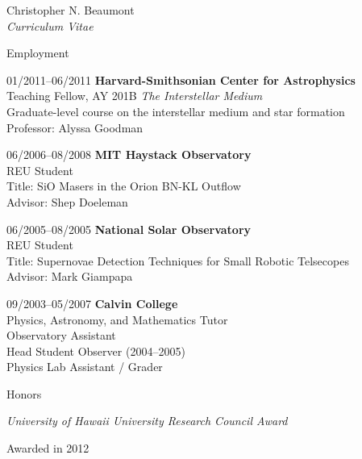\documentclass[10pt]{article}
\newenvironment{sublist}{%
	\begin{list}{}{%
		\setlength{\itemsep}{0em}\setlength{\parsep}{0em}%
		\setlength{\topsep}{0em}\setlength{\parskip}{0em}%
	}%
}%
{ \end{list} }
\begin{document}
\begin{cv}{Christopher N. Beaumont\\{\large \itshape Curriculum Vitae}}
\begin{cvlist}{Employment}
	\item[01/2011--06/2011] \textbf{Harvard-Smithsonian Center for Astrophysics} \\
	Teaching Fellow, AY 201B \textit{The Interstellar Medium} \\
	Graduate-level course on the interstellar medium and star formation \\
	Professor: Alyssa Goodman \\
	
	\item[06/2006--08/2008] \textbf{MIT Haystack Observatory} \\
	REU Student \\
	Title: SiO Masers in the Orion BN-KL Outflow \\
	Advisor: Shep Doeleman \\

	\item[06/2005--08/2005] \textbf{National Solar Observatory} \\
	REU Student \\
	Title:	Supernovae Detection Techniques for Small Robotic Telsecopes \\
	Advisor: Mark Giampapa \\

	\item[09/2003--05/2007] \textbf{Calvin College}\\
	Physics, Astronomy, and Mathematics Tutor \\
	Observatory Assistant \\
	Head Student Observer (2004--2005) \\
	Physics Lab Assistant / Grader \\

\end{cvlist}

\begin{cvlist}{Honors}

\item
	\emph{University of Hawaii University Research Council Award}
	\begin{sublist}
	\item Awarded in 2012
	\end{sublist}


\end{cvlist}
\end{cv}
\end{document}
